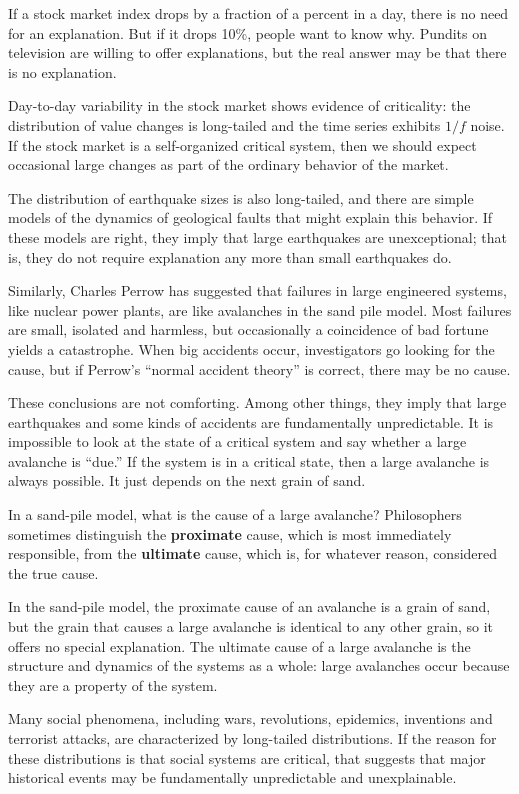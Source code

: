 \documentclass[10pt]{book}
\begin{document}
If a stock market index drops by a fraction of a percent in a
day, there is no need for an explanation.  But if it drops 10\%,
people want to know why.  Pundits
on television are willing to offer explanations, but the real
answer may be that there is no explanation.

Day-to-day variability in the stock market shows evidence of
criticality: the distribution of value changes is long-tailed
and the time series exhibits $1/f$ noise.
If the stock market is a self-organized critical system, then we
should expect occasional large changes as part of the ordinary
behavior of the market.

The distribution of earthquake sizes is also long-tailed,
and there are simple models of the dynamics of geological faults
that might explain this behavior.  If these models are right,
they imply that large earthquakes are unexceptional; that is,
they do not require explanation any more than
small earthquakes do.

Similarly, Charles Perrow has suggested that failures in large
engineered systems, like nuclear power plants, are like avalanches
in the sand pile model.  Most failures are small, isolated and
harmless, but occasionally a coincidence of bad fortune yields a
catastrophe.  When big accidents occur, investigators go looking for
the cause, but if Perrow's ``normal accident theory'' is correct,
there may be no cause.

These conclusions are not comforting.  Among other things, they
imply that large earthquakes and some kinds of accidents are
fundamentally unpredictable.  It is impossible to look at the
state of a critical system and say whether a large avalanche
is ``due.''  If the system is in a critical state, then a large
avalanche is always possible.  It just depends on the
next grain of sand.

In a sand-pile model, what is the cause of a large avalanche?
Philosophers sometimes distinguish the {\bf proximate} cause, which is
most immediately responsible, from the {\bf ultimate} cause, which is,
for whatever reason, considered the true cause.

In the sand-pile model, the proximate cause of an avalanche is
a grain of sand, but the grain that causes a large avalanche
is identical to any other grain, so it offers no special explanation.
The ultimate cause of a large avalanche is the structure and
dynamics of the systems as a whole: large avalanches occur because
they are a property of the system.

Many social phenomena, including wars, revolutions, epidemics,
inventions and terrorist attacks, are characterized by long-tailed
distributions.  If the reason for these distributions is that
social systems are critical, that suggests that major historical
events may be fundamentally unpredictable and unexplainable.
\end{document}
